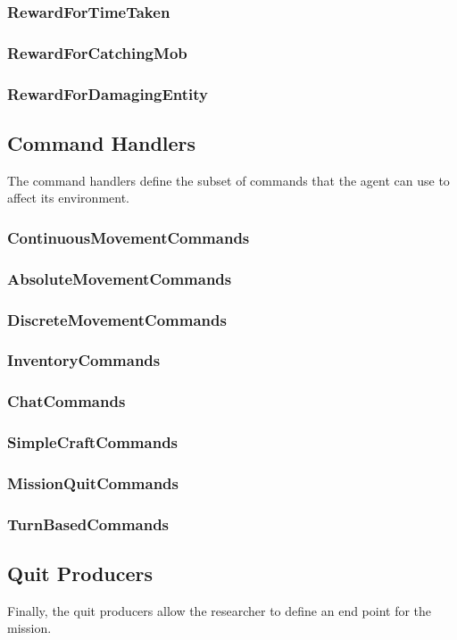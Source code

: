 \documentclass[11pt]{article} %
\begin{document}
\subsubsection{RewardForTimeTaken}
\subsubsection{RewardForCatchingMob}
\subsubsection{RewardForDamagingEntity}

\subsection{Command Handlers}
The command handlers define the subset of commands that the agent can use to affect its environment.

\subsubsection{ContinuousMovementCommands}
\subsubsection{AbsoluteMovementCommands}
\subsubsection{DiscreteMovementCommands}
\subsubsection{InventoryCommands}
\subsubsection{ChatCommands}
\subsubsection{SimpleCraftCommands}
\subsubsection{MissionQuitCommands}
\subsubsection{TurnBasedCommands}

\subsection{Quit Producers}
Finally, the quit producers allow the researcher to define an end point for the mission.
\end{document}
